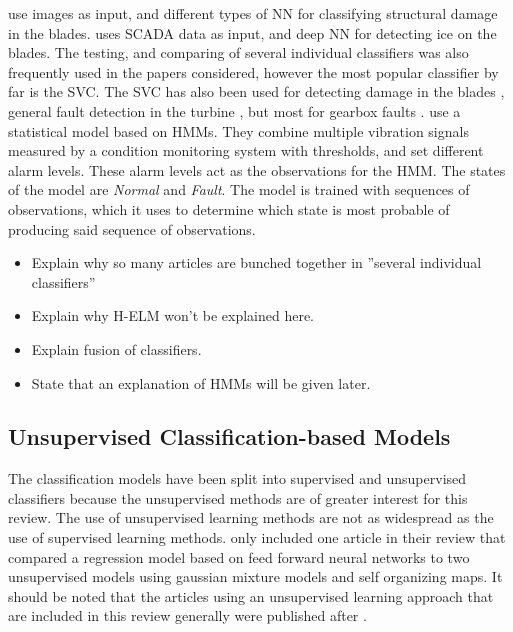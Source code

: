 \textcite{image_based_surface_damage_detection_DL_drone_inspection, image_based_YOLO_YSODA, AI_image_analytics_2_classify_blade_defects, blade_defect_detection_imaging_array} use images as input, and different types of NN for classifying structural damage in the blades. 
\textcite{deep_learning_for_imbalanced_class_detection_bearing_cm} uses SCADA data as input, and deep NN for detecting ice on the blades. 
The testing, and comparing of several individual classifiers was also frequently used in the papers considered, however the most popular classifier by far is the SVC. 
The SVC has also been used for detecting damage in the blades \cite{blade_damage_detection_sup_ml_alg}, general fault detection in the turbine \cite{fault_classification_using_CSO_SVM}, but most for gearbox faults \cite{VMD_MPE_COVAL_fault_detection_gearbox,vibration_acustic_decision_tree_SVM_gearbox, integrated_cm_bearing_fault_wt_gearbox, roller_bearings_cm_fisher_score_and_permutation_entropy}. 
\textcite{fault_monitoring_HMM} use a statistical model based on HMMs. 
They combine multiple vibration signals measured by a condition monitoring system with thresholds, and set different alarm levels. 
These alarm levels act as the observations for the HMM. 
The states of the model are \textit{Normal} and \textit{Fault}. 
The model is trained with sequences of observations, which it uses to determine which state is most probable of producing said sequence of observations. \bigskip 

\begin{itemize}
    \item Explain why so many articles are bunched together in ''several individual classifiers''
    \item Explain why H-ELM won't be explained here. 
    \item Explain fusion of classifiers.
    \item State that an explanation of HMMs will be given later.
\end{itemize}

\newpage
\subsection{Unsupervised Classification-based Models}
The classification models have been split into supervised and unsupervised classifiers because the unsupervised methods are of greater interest for this review. 
The use of unsupervised learning methods are not as widespread as the use of supervised learning methods. 
\textcite{ml_for_wt_cond_monit_rev} only included one article in their review that compared a regression model based on feed forward neural networks to two unsupervised models using gaussian mixture models and self organizing maps. 
It should be noted that the articles using an unsupervised learning approach that are included in this review generally were published after \textcite{ml_for_wt_cond_monit_rev}.

